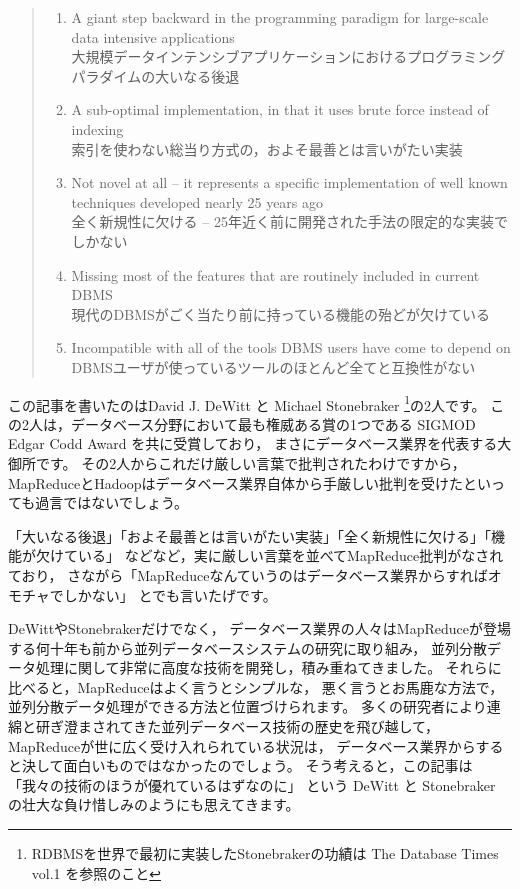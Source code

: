 \begin{quote}
\begin{enumerate}
 \item A giant step backward in the programming paradigm for large-scale data intensive applications \\
	   大規模データインテンシブアプリケーションにおけるプログラミングパラダイムの大いなる後退
 \item A sub-optimal implementation, in that it uses brute force instead of indexing \\
	   索引を使わない総当り方式の，およそ最善とは言いがたい実装
 \item Not novel at all -- it represents a specific implementation of well known techniques developed nearly 25 years ago \\
	   全く新規性に欠ける -- 25年近く前に開発された手法の限定的な実装でしかない
 \item Missing most of the features that are routinely included in current DBMS \\
	   現代のDBMSがごく当たり前に持っている機能の殆どが欠けている
 \item Incompatible with all of the tools DBMS users have come to depend on \\
	   DBMSユーザが使っているツールのほとんど全てと互換性がない
\end{enumerate}
\end{quote}

この記事を書いたのはDavid J. DeWitt と Michael Stonebraker \footnote{RDBMSを世界で最初に実装したStonebrakerの功績は The Database Times vol.1 を参照のこと}の2人です。
この2人は，データベース分野において最も権威ある賞の1つである SIGMOD Edgar Codd Award を共に受賞しており，
まさにデータベース業界を代表する大御所です。
その2人からこれだけ厳しい言葉で批判されたわけですから，
MapReduceとHadoopはデータベース業界自体から手厳しい批判を受けたといっても過言ではないでしょう。

「大いなる後退」「およそ最善とは言いがたい実装」「全く新規性に欠ける」「機能が欠けている」
などなど，実に厳しい言葉を並べてMapReduce批判がなされており，
さながら「MapReduceなんていうのはデータベース業界からすればオモチャでしかない」
とでも言いたげです。

DeWittやStonebrakerだけでなく，
データベース業界の人々はMapReduceが登場する何十年も前から並列データベースシステムの研究に取り組み，
並列分散データ処理に関して非常に高度な技術を開発し，積み重ねてきました。
それらに比べると，MapReduceはよく言うとシンプルな，
悪く言うとお馬鹿な方法で，並列分散データ処理ができる方法と位置づけられます。
多くの研究者により連綿と研ぎ澄まされてきた並列データベース技術の歴史を飛び越して，
MapReduceが世に広く受け入れられている状況は，
データベース業界からすると決して面白いものではなかったのでしょう。
そう考えると，この記事は「我々の技術のほうが優れているはずなのに」
という DeWitt と Stonebraker の壮大な負け惜しみのようにも思えてきます。

